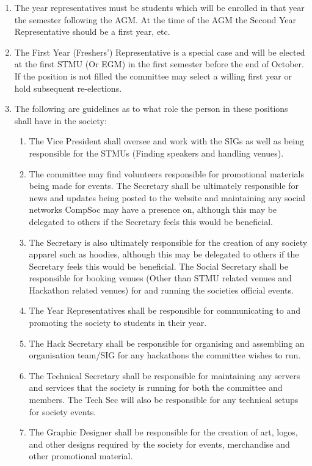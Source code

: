 \begin{enumerate}
\item The year representatives must be students which will be enrolled in that year the semester following the AGM\@. At the time of the AGM the Second Year Representative should be a first year, etc.

\item The First Year (Freshers') Representative is a special case and will be elected at the first STMU (Or EGM) in the first semester before the end of October. If the position is not filled the committee may select a willing first year or hold subsequent re-elections.

\item The following are guidelines as to what role the person in these positions shall have in the society:
  \begin{enumerate}
  \item The Vice President shall oversee and work with the SIGs as well as being responsible for the STMUs (Finding speakers and handling venues).
  \item The committee may find volunteers responsible for promotional materials being made for events. The Secretary shall be ultimately responsible for news and updates being posted to the website and maintaining any social networks CompSoc may have a presence on, although this may be delegated to others if the Secretary feels this would be beneficial.
  \item The Secretary is also ultimately responsible for the creation of any society apparel such as hoodies, although this may be delegated to others if the Secretary feels this would be beneficial. The Social Secretary shall be responsible for booking venues (Other than STMU related venues and Hackathon related venues) for and running the societies official events.
  \item The Year Representatives shall be responsible for communicating to and promoting the society to students in their year.
  \item The Hack Secretary shall be responsible for organising and assembling an organisation team/SIG for any hackathons the committee wishes to run.
  \item The Technical Secretary shall be responsible for maintaining any servers and services that the society is running for both the committee and members. The Tech Sec will also be responsible for any technical setups for society events.
  \item The Graphic Designer shall be responsible for the creation of art, logos, and other designs required by the society for events, merchandise and other promotional material.
  \end{enumerate}


\end{enumerate}
